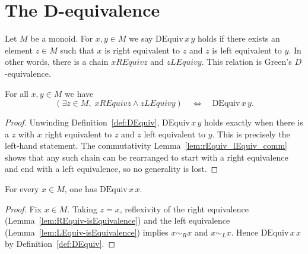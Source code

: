 \section{The D-equivalence}

\begin{definition}[D-equivalence]
\label{def:DEquiv}
Let \(M\) be a monoid.  For \(x,y\in M\) we say \(\mathrm{DEquiv}\,x\,y\) holds if there exists an element \(z\in M\) such that \(x\) is right equivalent to \(z\) and \(z\) is left equivalent to \(y\).  In other words, there is a chain \(x \mathrel{REquiv} z\) and \(z \mathrel{LEquiv} y\).  This relation is Green's \(D\)-equivalence.
\leanok
\end{definition}

\begin{lemma}
\label{lem:DEquiv-comm}
For all \(x,y\in M\) we have
\[
  (\exists z\in M,\; x \mathrel{REquiv} z \land z \mathrel{LEquiv} y)\quad\Longleftrightarrow\quad \mathrm{DEquiv}\,x\,y.
\]
\leanok
{}
\end{lemma}
\begin{proof}
\leanok
Unwinding Definition~\ref{def:DEquiv}, \(\mathrm{DEquiv}\,x\,y\) holds exactly when there is a \(z\) with \(x\) right equivalent to \(z\) and \(z\) left equivalent to \(y\).  This is precisely the left‑hand statement.  The commutativity Lemma~\ref{lem:rEquiv_lEquiv_comm} shows that any such chain can be rearranged to start with a right equivalence and end with a left equivalence, so no generality is lost.
\end{proof}

\begin{lemma}
\label{lem:DEquiv-refl}
For every \(x\in M\), one has \(\mathrm{DEquiv}\,x\,x\).
\leanok
{}
\end{lemma}
\begin{proof}
\leanok
Fix \(x\in M\).  Taking \(z=x\), reflexivity of the right equivalence (Lemma~\ref{lem:REquiv-isEquivalence}) and the left equivalence (Lemma~\ref{lem:LEquiv-isEquivalence}) implies \(x \sim_R x\) and \(x \sim_L x\).  Hence \(\mathrm{DEquiv}\,x\,x\) by Definition~\ref{def:DEquiv}.
\end{proof}

